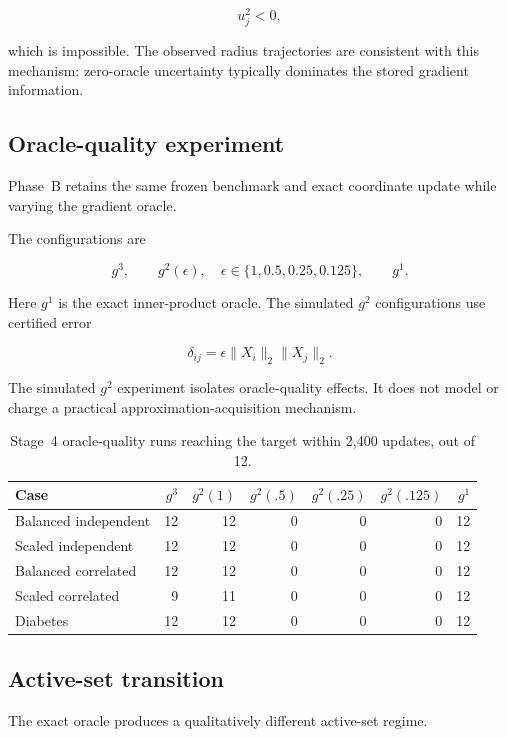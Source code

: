 \documentclass[11pt]{article}
\begin{document}
\[
u_j^2<0,
\]

which is impossible. The observed radius trajectories are consistent
with this mechanism: zero-oracle uncertainty typically dominates the
stored gradient information.


\subsection{Oracle-quality experiment}

Phase~B retains the same frozen benchmark and exact coordinate update
while varying the gradient oracle.

The configurations are

\[
g^3,
\qquad
g^2(\epsilon),
\quad
\epsilon\in
\{1,0.5,0.25,0.125\},
\qquad
g^1.
\]

Here $g^1$ is the exact inner-product oracle. The simulated $g^2$
configurations use certified error

\[
\delta_{ij}
=
\epsilon\|X_i\|_2\|X_j\|_2.
\]

The simulated $g^2$ experiment isolates oracle-quality effects. It does
not model or charge a practical approximation-acquisition mechanism.

\begin{table}[!htbp]
\centering
\caption{
Stage~4 oracle-quality runs reaching the target within 2,400 updates,
out of 12.
}
\label{tab:stage4-success}
\small
\begin{tabular}{lrrrrrr}
\toprule
Case
& $g^3$
& $g^2(1)$
& $g^2(.5)$
& $g^2(.25)$
& $g^2(.125)$
& $g^1$ \\
\midrule
Balanced independent & 12 & 12 & 0 & 0 & 0 & 12 \\
Scaled independent   & 12 & 12 & 0 & 0 & 0 & 12 \\
Balanced correlated  & 12 & 12 & 0 & 0 & 0 & 12 \\
Scaled correlated    &  9 & 11 & 0 & 0 & 0 & 12 \\
Diabetes             & 12 & 12 & 0 & 0 & 0 & 12 \\
\bottomrule
\end{tabular}
\end{table}


\subsection{Active-set transition}

The exact oracle produces a qualitatively different active-set regime.
\end{document}
